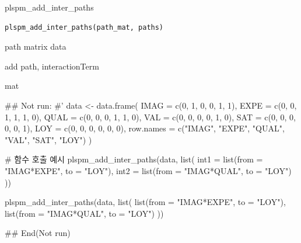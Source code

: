 \documentclass[a4paper]{book}
\begin{document}
%
\begin{Description}
plspm\_add\_inter\_paths
\end{Description}
%
\begin{Usage}
\begin{verbatim}
plspm_add_inter_paths(path_mat, paths)
\end{verbatim}
\end{Usage}
%
\begin{Arguments}
\begin{ldescription}
\item[\code{path\_mat}] path matrix data

\item[\code{paths}] add path, interactionTerm
\end{ldescription}
\end{Arguments}
%
\begin{Value}
mat
\end{Value}
%
\begin{Examples}
\begin{ExampleCode}


\#\# Not run: 
#'
data <- data.frame(
  IMAG = c(0, 1, 0, 0, 1, 1),
  EXPE = c(0, 0, 1, 1, 1, 0),
  QUAL = c(0, 0, 0, 1, 1, 0),
  VAL  = c(0, 0, 0, 0, 1, 0),
  SAT  = c(0, 0, 0, 0, 0, 1),
  LOY  = c(0, 0, 0, 0, 0, 0),
  row.names = c("IMAG", "EXPE", "QUAL", "VAL", "SAT", "LOY")
)

# 함수 호출 예시
plspm_add_inter_paths(data, list(
  int1 = list(from = "IMAG*EXPE", to = "LOY"),
  int2 = list(from = "IMAG*QUAL", to = "LOY")
))

plspm_add_inter_paths(data, list(
  list(from = "IMAG*EXPE", to = "LOY"),
  list(from = "IMAG*QUAL", to = "LOY")
))



## End(Not run)


\end{ExampleCode}
\end{Examples}
\end{document}
